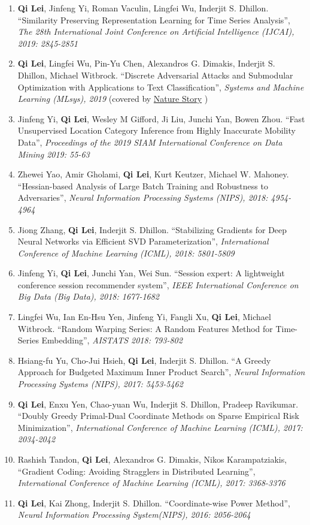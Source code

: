 \documentclass[margin, 10pt]{res} %
\begin{document}
\begin{resume}
\begin{enumerate}
  \item{ \textbf{Qi Lei}, Jinfeng Yi, Roman Vaculin, Lingfei Wu, Inderjit S. 
      Dhillon. ``Similarity Preserving Representation Learning for Time Series 
      Analysis'', \textit{The 28th International Joint Conference on Artificial 
    Intelligence (IJCAI), 2019: 2845-2851}}
  \item{\textbf{Qi Lei}, Lingfei Wu, Pin-Yu Chen, Alexandros G. Dimakis, Inderjit S. 
    Dhillon, Michael Witbrock. ``Discrete Adversarial Attacks and Submodular 
    Optimization with Applications to Text Classification'', \textit{Systems and Machine 
  Learning (MLsys), 2019} (covered by \href{https://www.nature.com/articles/d41586-019-01510-1}{Nature Story} )   }
\item{Jinfeng Yi, \textbf{Qi Lei}, Wesley M Gifford, Ji Liu, Junchi Yan, Bowen Zhou. ``Fast Unsupervised Location Category Inference from Highly Inaccurate Mobility Data'', \textit{Proceedings of the 2019 SIAM International Conference on Data Mining 2019: 55-63}}
\item{Zhewei Yao, Amir Gholami, \textbf{Qi Lei}, Kurt Keutzer, Michael W. 
  Mahoney. ``Hessian-based Analysis of Large Batch Training and Robustness to 
Adversaries'', \textit{Neural Information Processing Systems (NIPS), 2018: 4954-4964}}
  \item{Jiong Zhang, \textbf{Qi Lei}, Inderjit S. Dhillon. 
        ``Stabilizing Gradients for Deep 
       Neural Networks via Efficient SVD Parameterization'', \textit{
    International Conference of Machine Learning (ICML), 2018: 5801-5809}}
\item{Jinfeng Yi, \textbf{Qi Lei}, Junchi Yan, Wei Sun. ``Session expert: A lightweight conference session recommender system'', \textit{IEEE International Conference on Big Data (Big Data), 2018: 1677-1682}}
  \item{Lingfei Wu, Ian En-Hsu Yen, Jinfeng Yi, Fangli Xu, \textbf{Qi Lei}, Michael Witbrock.
    ``Random Warping Series: A Random Features Method for Time-Series Embedding'', \textit{AISTATS 2018: 793-802}}
\item{Hsiang-fu Yu, Cho-Jui Hsieh, \textbf{Qi Lei}, Inderjit S. Dhillon. 
      ``A Greedy Approach for Budgeted Maximum 
      Inner Product Search'', \textit{Neural Information Processing Systems 
      (NIPS), 2017: 5453-5462}}
    \item{\textbf{Qi Lei}, Enxu Yen, Chao-yuan Wu, Inderjit S. Dhillon, Pradeep 
        Ravikumar. ``Doubly Greedy Primal-Dual Coordinate Methods on Sparse Empirical 
  Risk Minimization'', \textit{International Conference of Machine 
    Learning (ICML), 2017: 2034-2042}}
\item{Rashish Tandon, \textbf{Qi Lei}, 
    Alexandros G. Dimakis, Nikos Karampatziakis, ``Gradient Coding: Avoiding 
    Stragglers in Distributed Learning'', \textit{International Conference of 
  Machine Learning (ICML), 2017: 3368-3376}}
  \item {\textbf{Qi Lei},
      Kai Zhong, Inderjit S. Dhillon. ``Coordinate-wise Power Method'', 
  \textit{Neural Information Processing System(NIPS), 2016: 2056-2064}}		


\end{enumerate}
\end{resume}
\end{document}
